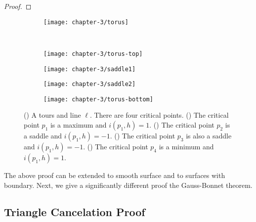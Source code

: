 \begin{proof}
\end{proof}

 \begin{figure}[htb]
         \centering
        \begin{subfigure}[b]{0.3\textwidth}
         \texttt{[image: chapter-3/torus]}
 	 \label{fig:torus-ell}
       \end{subfigure}\\
         \begin{subfigure}[b]{0.21\textwidth}
         \texttt{[image: chapter-3/torus-top]}
          \label{fig:max}
         \end{subfigure}
          \begin{subfigure}[b]{0.21\textwidth}
         \texttt{[image: chapter-3/saddle1]}
          \label{fig:saddle1}
         \end{subfigure}
         \begin{subfigure}[b]{0.21\textwidth}
         \texttt{[image: chapter-3/saddle2]}
          \label{fig:saddle2}
         \end{subfigure}
         \begin{subfigure}[b]{0.21\textwidth}
         \texttt{[image: chapter-3/torus-bottom]}
         \label{fig:min}
         \end{subfigure}
		\caption{() A tours and line $\ell$. There are four critical points.
 		() The critical point $p_1$ is a maximum and $i(p_1,h)=1$.
		() The critical point $p_2$ is a saddle and $i(p_1,h)=-1$.
		() The critical point $p_3$ is also a saddle and $i(p_1,h)=-1$.
		() The critical point $p_4$ is a minimum and $i(p_1,h)=1$.
 		\label{fig:torus-total}}
 \end{figure}


The above proof can be extended to smooth surface and to surfaces with boundary.
Next, we give a significantly different proof the Gauss-Bonnet theorem. 



\subsection{Triangle Cancelation Proof}
\label{sec:proof}


